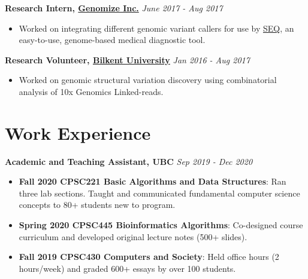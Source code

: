 \documentclass[margin]{res}
\begin{document}
\begin{resume}
    	\textbf{Research Intern, \href{http://www.genomize.com}{Genomize Inc.}}  \hfill \textit{June 2017 - Aug 2017} \\
    	\vspace{-1em}
        \begin{itemize}[leftmargin=*]
    	    \item Worked on integrating different genomic variant callers for use by \href{https://seq.genomize.com}{SEQ}, an easy-to-use, genome-based medical diagnostic tool.
    	\end{itemize}

        \textbf{Research Volunteer, \href{http://alkanlab.org/}{Bilkent University}}  \hfill \textit{Jan 2016 - Aug 2017} \\
    	\vspace{-1em}
        \begin{itemize}[leftmargin=*]
    	    \item Worked on genomic structural variation discovery using combinatorial analysis of 10x Genomics Linked-reads. 
    	\end{itemize}

	\section{Work Experience}
    	\textbf{Academic and Teaching Assistant, UBC}  \hfill \textit{Sep 2019 - Dec 2020} \\
    	\vspace{-1em}
        \begin{itemize}[leftmargin=*]
            \item \textbf{Fall 2020 CPSC221 Basic Algorithms and Data Structures}: Ran three lab sections. Taught and communicated fundamental computer science concepts to 80+ students new to program.
            \item \textbf{Spring 2020 CPSC445 Bioinformatics Algorithms}: Co-designed course curriculum and developed original lecture notes (500+ slides).
            \item \textbf{Fall 2019 CPSC430 Computers and Society}: Held office hours (2 hours/week) and graded 600+ essays by over 100 students.
        \end{itemize}
    	

\end{resume}
\end{document}
